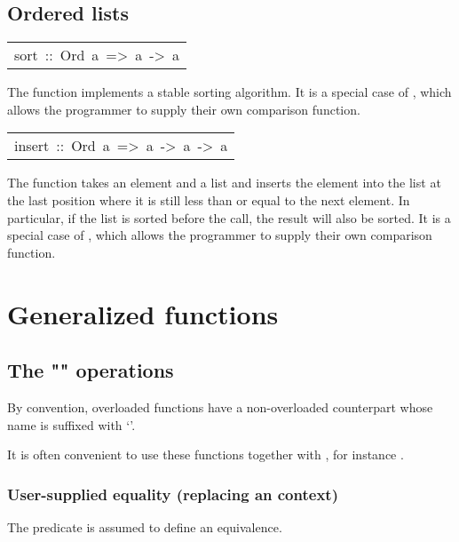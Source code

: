 \subsection{Ordered lists
}
\begin{haddockdesc}
\item[\begin{tabular}{@{}l}
sort\ ::\ Ord\ a\ =>\ {\char 91}a{\char 93}\ ->\ {\char 91}a{\char 93}
\end{tabular}]\haddockbegindoc
The  function implements a stable sorting algorithm.
 It is a special case of , which allows the programmer to supply
 their own comparison function.
\par

\end{haddockdesc}
\begin{haddockdesc}
\item[\begin{tabular}{@{}l}
insert\ ::\ Ord\ a\ =>\ a\ ->\ {\char 91}a{\char 93}\ ->\ {\char 91}a{\char 93}
\end{tabular}]\haddockbegindoc
The  function takes an element and a list and inserts the
 element into the list at the last position where it is still less
 than or equal to the next element.  In particular, if the list
 is sorted before the call, the result will also be sorted.
 It is a special case of , which allows the programmer to
 supply their own comparison function.
\par

\end{haddockdesc}
\section{Generalized functions
}
\subsection{The "" operations
}
By convention, overloaded functions have a non-overloaded
 counterpart whose name is suffixed with `'.
\par
It is often convenient to use these functions together with
 , for instance .
\par

\subsubsection{User-supplied equality (replacing an  context)
}
The predicate is assumed to define an equivalence.
\par

